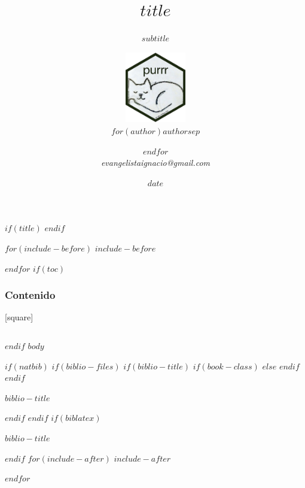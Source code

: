 \documentclass[$if(fontsize)$$fontsize$,$endif$$if(handout)$handout,$endif$$if(beamer)$ignorenonframetext,$endif$$for(classoption)$$classoption$$sep$,$endfor$,handout]{$documentclass$}
\title{$title$}
\subtitle{$subtitle$}
\author{\includegraphics[width=0.2\textwidth]{purrr.jpg}\\ $for(author)$$author$$sep$ \and $endfor$\\
\institute[A]{
Grupo de Usuaries de R en Rosario
}
\textit{evangelistaignacio@gmail.com}}
\date{$date$}
\begin{document}
	$if(title)$
	\frame{\titlepage}
	$endif$
	
	$for(include-before)$
	$include-before$
	
	$endfor$
	$if(toc)$
\begin{frame}
\frametitle{Contenido} %
[square]
\begin{columns}[t]
		\tableofcontents[sections={1-3}]
		\tableofcontents[sections={4-8}]
\end{columns}
\end{frame}

$endif$
$body$

$if(natbib)$
$if(biblio-files)$
$if(biblio-title)$
$if(book-class)$
\renewcommand\bibname{$biblio-title$}
$else$
\renewcommand\refname{$biblio-title$}
$endif$
$endif$
\begin{frame}[allowframebreaks]{$biblio-title$}

\end{frame}

$endif$
$endif$
$if(biblatex)$
\begin{frame}[allowframebreaks]{$biblio-title$}
\printbibliography[heading=none]
\end{frame}

$endif$
$for(include-after)$
$include-after$

$endfor$
\end{document}
